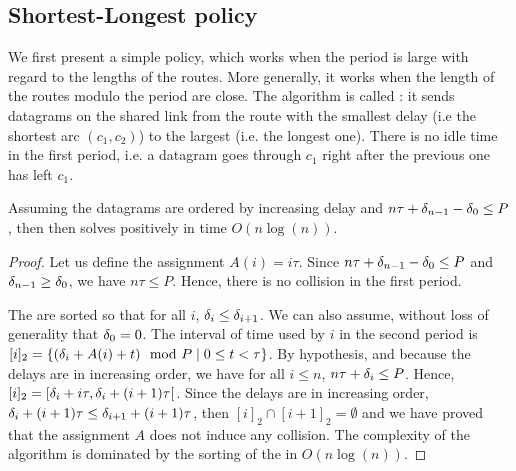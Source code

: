   \subsection{Shortest-Longest policy}
   


    We first present a simple policy, which works when the period is large with regard to the lengths of the routes. More generally, it works when the length of the routes modulo the period are close. The algorithm is called \shortestlongest: it sends datagrams on the shared link from the route with the smallest delay (i.e the shortest arc $(c_1,c_2)$) to the largest (i.e. the longest one). There is no idle time in the first period, i.e. a datagram goes through $c_1$ right after the previous one has left $c_1$.

      \begin{proposition} Assuming the datagrams are ordered by increasing delay and $n\tau + \delta_{n-1} - \delta_0 \leq P$, then then \shortestlongest solves \pma positively in time $O(n\log(n))$.\label{prop:SL}
      \end{proposition}
      \begin{proof}
      Let us define the assignment $A(i) = i \tau$. Since $n\tau + \delta_{n-1} - \delta_0 \leq P$ and $\delta_{n-1} \geq \delta_0$, we have $n\tau \leq P$. Hence, there is no collision in the first period.

      The \nomdelaypluriel are sorted so that for all $i$, $\delta_i \leq \delta_{i+1}$. We can also assume, without loss of generality that $\delta_0 = 0$. The interval of time used by $i$ in the second period is $[i]_2 = \{ (\delta_i + A(i) + t) \mod P \mid 0 \leq t < \tau \}$. By hypothesis, and because the delays are in increasing order, we have for all $i\leq n$, $n\tau + \delta_{i} \leq P$. Hence, $[i]_2 = [\delta_i + i\tau, \delta_i + (i+1)\tau[$. Since the delays are in increasing order, $\delta_i + (i+1)\tau \leq \delta_{i+1} + (i+1)\tau$, then $[i]_2 \cap [i+1]_2 = \emptyset$
      and we have proved that the assignment $A$ does not induce any collision.
        The complexity of the algorithm is dominated by the sorting of the \nomdelaypluriel in $O(n\log(n))$. 
      
      \end{proof}
